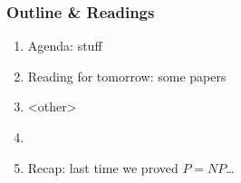   \begin{frame}  %
    \frametitle{Outline \& Readings}

\tableofcontents[subsectionstyle=show/hide/hide]


\begin{comment}
\begin{enumerate}
\item Please fill out an index card w/ your 1st \& last name, preferred email;  discipline, disciplinary interests, next academic hurdle (e.g. PhD candidacy/dissertation/\ldots). Turn in at end \textit{if} you're likely to keep attending.
\item Readings to be distributed via a Box folder: \url{tinyurl.com/ya3rwwym}.  You'll need to authenticate using your umich credentials. 
\item Reading for: Kinder \& Palfrey, ``On Behalf of an Experimental Political Science,'' \S~2 (pp.5--10); Rosenbaum, \textit{Design of Observational Studies}, \S~2.1--2.2.1.  
\item We can recommend John Fox's Intro to R course, starting tomorrow evening. 
\end{enumerate}
\end{comment}


\begin{enumerate}
\item Agenda: stuff
\item Reading for tomorrow: some papers
\item <other>
\item <Assignment-related>
\item Recap: last time we proved $P=NP$\ldots
\end{enumerate}
\end{frame}  %


\endinput
\begin{enumerate}
\item Agenda:
\item Reading for tomorrow: 
\item <other>
\item <Assignment-related>
\item Recap: 
\end{enumerate}
\end{frame}
 \itnote{
 }


